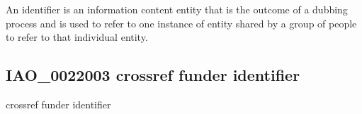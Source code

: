 \documentclass[letterpaper,10pt,english]{sphinxmanual}
\begin{document}
\begin{sphinxShadowBox}

\sphinxAtStartPar
{\hyperref[\detokenize{doc-IAO_0000030::doc}]{}}
\end{sphinxShadowBox}

\begin{sphinxShadowBox}

\sphinxAtStartPar
An identifier is an information content entity that is the outcome of a dubbing process and is used to refer to one instance of entity shared by a group of people to refer to that individual entity.
\end{sphinxShadowBox}

\begin{sphinxShadowBox}

\sphinxAtStartPar
{}
\end{sphinxShadowBox}
\begin{quote}

\ignorespaces \end{quote}


\subsection{IAO\_0022003 \sphinxhyphen{} crossref funder identifier}
\label{\detokenize{doc-IAO_0022003:iao-0022003-crossref-funder-identifier}}\label{\detokenize{doc-IAO_0022003:index-0}}\label{\detokenize{doc-IAO_0022003::doc}}
\begin{sphinxShadowBox}

\sphinxAtStartPar
crossref funder identifier
\end{sphinxShadowBox}

\begin{sphinxShadowBox}

\sphinxAtStartPar
{\hyperref[\detokenize{doc-IAO_0000578::doc}]{}}
\end{sphinxShadowBox}
\end{document}
